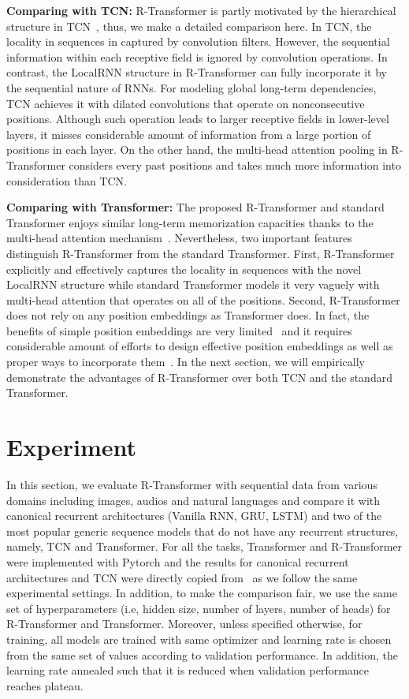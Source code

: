 \documentclass{article} \usepackage{iclr2019_conference,times}
\begin{document}
{\bf Comparing with TCN:} R-Transformer is partly motivated by the hierarchical structure in TCN~\citet{bai2018empirical}, thus, we make a detailed comparison here. In TCN, the locality in sequences in captured by convolution filters. However, the sequential information within each receptive field is ignored by convolution operations. In contrast, the LocalRNN structure in R-Transformer can fully incorporate it by the sequential nature of RNNs. For modeling global long-term dependencies, TCN achieves it with dilated convolutions that operate on nonconsecutive positions. Although such operation leads to larger receptive fields in lower-level layers, it misses considerable amount of information from a large portion of positions in each layer. On the other hand, the multi-head attention pooling in R-Transformer considers every past positions and takes much more information into consideration than TCN.

{\bf Comparing with Transformer:} The proposed R-Transformer and standard Transformer enjoys similar long-term memorization capacities thanks to the multi-head attention mechanism~\citep{vaswani2017attention}. Nevertheless, two important features distinguish R-Transformer from the standard Transformer. First, R-Transformer explicitly and effectively captures the locality in sequences with the novel LocalRNN structure while standard Transformer models it very vaguely with multi-head attention that operates on all of the positions. Second, R-Transformer does not rely on any position embeddings as Transformer does. In fact, the benefits of simple position embeddings are very limited~\citep{al2018character} and it requires considerable amount of efforts to design effective position embeddings as well as proper ways to incorporate them~\citep{dai2019transformer}. In the next section, we will empirically demonstrate the advantages of R-Transformer over both TCN and the standard Transformer. 
 \section{Experiment}
In this section, we evaluate R-Transformer with sequential data from various domains including images, audios and natural languages and compare it with canonical recurrent architectures (Vanilla RNN, GRU, LSTM) and two of the most popular generic sequence models that do not have any recurrent structures, namely, TCN and Transformer. For all the tasks, Transformer and R-Transformer were implemented with Pytorch and the results for canonical recurrent architectures and TCN were directly copied from~\citet{bai2018empirical} as we follow the same experimental settings. In addition, to make the comparison fair, we use the same set of hyperparameters (i.e, hidden size, number of layers, number of heads) for R-Transformer and Transformer. Moreover, unless specified otherwise, for training, all models are trained with same optimizer and learning rate is chosen from the same set of values according to validation performance. In addition, the learning rate annealed such that it is reduced when validation performance reaches plateau.
\end{document}
